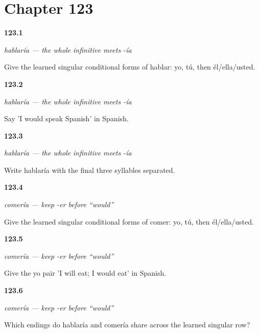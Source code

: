 \section*{Chapter 123}

\noindent\begin{minipage}[t]{\linewidth}
\raggedright
\hypertarget{review-ES-C17-condicional-singular-forms}{\textbf{123.1}} \emph{hablaría — the whole infinitive meets -ía}\par
\small Give the learned singular conditional forms of hablar: yo, tú, then él/ella/usted.
\end{minipage}\par\medskip

\noindent\begin{minipage}[t]{\linewidth}
\raggedright
\hypertarget{review-ES-C17-condicional-hablaria-espanol}{\textbf{123.2}} \emph{hablaría — the whole infinitive meets -ía}\par
\small Say 'I would speak Spanish' in Spanish.
\end{minipage}\par\medskip

\noindent\begin{minipage}[t]{\linewidth}
\raggedright
\hypertarget{review-ES-C17-condicional-syllables}{\textbf{123.3}} \emph{hablaría — the whole infinitive meets -ía}\par
\small Write hablaría with the final three syllables separated.
\end{minipage}\par\medskip

\noindent\begin{minipage}[t]{\linewidth}
\raggedright
\hypertarget{review-ES-C17-comer-condicional-singular-forms}{\textbf{123.4}} \emph{comería — keep -er before “would”}\par
\small Give the learned singular conditional forms of comer: yo, tú, then él/ella/usted.
\end{minipage}\par\medskip

\noindent\begin{minipage}[t]{\linewidth}
\raggedright
\hypertarget{review-ES-C17-comer-condicional-future-pair}{\textbf{123.5}} \emph{comería — keep -er before “would”}\par
\small Give the yo pair 'I will eat; I would eat' in Spanish.
\end{minipage}\par\medskip

\noindent\begin{minipage}[t]{\linewidth}
\raggedright
\hypertarget{review-ES-C17-comer-condicional-shared-endings}{\textbf{123.6}} \emph{comería — keep -er before “would”}\par
\small Which endings do hablaría and comería share across the learned singular row?
\end{minipage}\par\medskip

